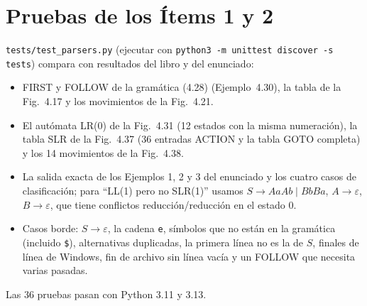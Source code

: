 \documentclass[11pt,a4paper]{article}
\newcommand{\eps}{\varepsilon}
\newcommand{\code}[1]{\texttt{#1}}
\begin{document}
\section{Pruebas de los Ítems 1 y 2}
\code{tests/test\_parsers.py} (ejecutar con \code{python3 -m unittest discover -s tests}) compara
con resultados del libro y del enunciado:
\begin{itemize}
\item FIRST y FOLLOW de la gramática (4.28) (Ejemplo~4.30), la tabla de la Fig.~4.17 y los
movimientos de la Fig.~4.21.
\item El autómata LR(0) de la Fig.~4.31 (12 estados con la misma numeración), la tabla SLR de la
Fig.~4.37 (36 entradas ACTION y la tabla GOTO completa) y los 14 movimientos de la Fig.~4.38.
\item La salida exacta de los Ejemplos 1, 2 y 3 del enunciado y los cuatro casos de
clasificación; para ``LL(1) pero no SLR(1)'' usamos $S \to AaAb \mid BbBa$, $A \to \eps$,
$B \to \eps$, que tiene conflictos reducción/reducción en el estado 0.
\item Casos borde: $S \to \eps$, la cadena \code{e}, símbolos que no están en la gramática (incluido
\code{\$}), alternativas duplicadas, la primera línea no es la de $S$, finales de línea de
Windows, fin de archivo sin línea vacía y un FOLLOW que necesita varias pasadas.
\end{itemize}
Las 36 pruebas pasan con Python 3.11 y 3.13.

\end{document}
